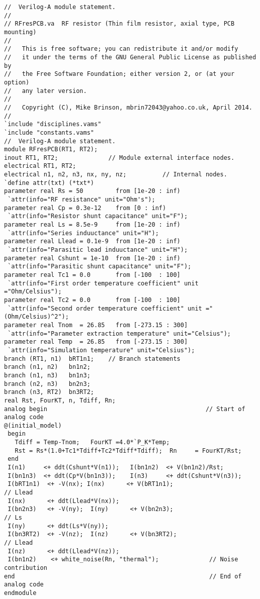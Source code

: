 \begin{verbatim}
//  Verilog-A module statement.
//
// RFresPCB.va  RF resistor (Thin film resistor, axial type, PCB mounting)
//
//   This is free software; you can redistribute it and/or modify
//   it under the terms of the GNU General Public License as published by
//   the Free Software Foundation; either version 2, or (at your option)
//   any later version.
//
//   Copyright (C), Mike Brinson, mbrin72043@yahoo.co.uk, April 2014.
//
`include "disciplines.vams"
`include "constants.vams"
//  Verilog-A module statement.
module RFresPCB(RT1, RT2);
inout RT1, RT2;              // Module external interface nodes.
electrical RT1, RT2;
electrical n1, n2, n3, nx, ny, nz;          // Internal nodes.
`define attr(txt) (*txt*)
parameter real Rs = 50         from [1e-20 : inf)
 `attr(info="RF resistance" unit="Ohm's");
parameter real Cp = 0.3e-12    from [0 : inf)
 `attr(info="Resistor shunt capacitance" unit="F");
parameter real Ls = 8.5e-9     from [1e-20 : inf)
 `attr(info="Series induuctance" unit="H");
parameter real Llead = 0.1e-9  from [1e-20 : inf)
 `attr(info="Parasitic lead induuctance" unit="H");
parameter real Cshunt = 1e-10  from [1e-20 : inf)
 `attr(info="Parasitic shunt capacitance" unit="F");
parameter real Tc1 = 0.0       from [-100  : 100]
 `attr(info="First order temperature coefficient" unit ="Ohm/Celsius");
parameter real Tc2 = 0.0       from [-100  : 100]
 `attr(info="Second order temperature coefficient" unit ="(Ohm/Celsius)^2");
parameter real Tnom  = 26.85   from [-273.15 : 300]
 `attr(info="Parameter extraction temperature" unit="Celsius");
parameter real Temp  = 26.85   from [-273.15 : 300]
 `attr(info="Simulation temperature" unit="Celsius");
branch (RT1, n1)  bRT1n1;    // Branch statements
branch (n1, n2)   bn1n2;
branch (n1, n3)   bn1n3;
branch (n2, n3)   bn2n3;
branch (n3, RT2)  bn3RT2;
real Rst, FourKT, n, Tdiff, Rn;
analog begin                                            // Start of analog code
@(initial_model)
 begin
   Tdiff = Temp-Tnom;   FourKT =4.0*`P_K*Temp;
   Rst = Rs*(1.0+Tc1*Tdiff+Tc2*Tdiff*Tdiff);  Rn     = FourKT/Rst;
 end
 I(n1)     <+ ddt(Cshunt*V(n1));   I(bn1n2)  <+ V(bn1n2)/Rst;
 I(bn1n3)  <+ ddt(Cp*V(bn1n3));    I(n3)     <+ ddt(Cshunt*V(n3));
 I(bRT1n1)  <+ -V(nx); I(nx)      <+ V(bRT1n1);                       // Llead
 I(nx)      <+ ddt(Llead*V(nx));
 I(bn2n3)   <+ -V(ny);  I(ny)      <+ V(bn2n3);                       // Ls
 I(ny)      <+ ddt(Ls*V(ny));
 I(bn3RT2)  <+ -V(nz);  I(nz)      <+ V(bn3RT2);                      // Llead
 I(nz)      <+ ddt(Llead*V(nz));
 I(bn1n2)    <+ white_noise(Rn, "thermal");              // Noise contribution
end                                                      // End of analog code
endmodule
\end{verbatim}

